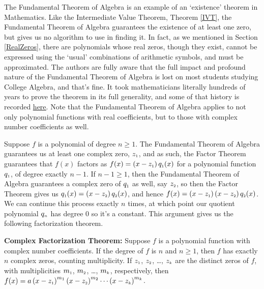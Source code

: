 \medskip

The Fundamental Theorem of Algebra is an example of an `existence' theorem in Mathematics.  Like the Intermediate Value Theorem, Theorem \ref{IVT}, the Fundamental Theorem of Algebra  guarantees the existence of at least one zero, but gives us no algorithm to use in finding it.  In fact, as we mentioned in Section \ref{RealZeros}, there are polynomials whose real zeros, though they exist, cannot be expressed using the `usual' combinations of arithmetic symbols, and must be approximated.  The authors are fully aware that the full impact and profound nature of the Fundamental Theorem of Algebra  is lost on most students studying College Algebra, and that's fine.  It took mathematicians literally hundreds of years to prove the theorem in its full generality, and some of that history is recorded \href{http://en.wikipedia.org/wiki/Fundamental_theorem_of_algebra}{\underline{here}}.  Note that the Fundamental Theorem of Algebra  applies to not only polynomial functions with real coefficients, but to those with complex number coefficients as well.  

\smallskip

Suppose  $f$ is a polynomial of degree $n \geq 1$.  The Fundamental Theorem of Algebra guarantees us at least one complex zero, $z_{\mbox{\tiny $1$}}$, and as such, the Factor Theorem guarantees that $f(x)$ factors as $f(x) = \left(x - z_{\mbox{\tiny $1$}}\right) q_{\mbox{\tiny $1$}}(x)$ for a polynomial function $q_{\mbox{\tiny $1$}}$,  of degree exactly $n-1$.  If $n-1 \geq 1$, then the Fundamental Theorem of Algebra guarantees a complex zero of $q_{\mbox{\tiny $1$}}$ as well, say $z_{\mbox{\tiny $2$}}$, so then the Factor Theorem gives us $q_{\mbox{\tiny $1$}}(x) = \left(x - z_{\mbox{\tiny $2$}}\right) q_{\mbox{\tiny $2$}}(x)$, and hence $f(x) = \left(x - z_{\mbox{\tiny $1$}}\right) \left(x - z_{\mbox{\tiny $2$}}\right) q_{\mbox{\tiny $2$}}(x)$.  We can continue this process exactly $n$ times, at which point our quotient polynomial $q_{\mbox{\tiny $n$}}$ has degree $0$ so it's a constant.  This argument gives us the following factorization theorem.

\smallskip

\colorbox{ResultColor}{\bbm
\begin{thm} \label{complexfactorization} \textbf{Complex Factorization Theorem:} Suppose $f$ is a polynomial function with complex number coefficients.  If the degree of $f$ is $n$ and $n \geq 1$, then  $f$ has exactly $n$ complex zeros, counting multiplicity.  If $z_{\mbox{\tiny $1$}}$, $z_{\mbox{\tiny $2$}}$, \ldots, $z_{\mbox{\tiny $k$}}$ are the distinct zeros of $f$, with multiplicities $m_{\mbox{\tiny $1$}}$, $m_{\mbox{\tiny $2$}}$, \ldots, $m_{\mbox{\tiny $k$}}$, respectively, then $f(x) = a\left(x - z_{\mbox{\tiny $1$}}  \right)^{m_{\mbox{\tiny $1$}}}\left(x - z_{\mbox{\tiny $2$}}  \right)^{m_{\mbox{\tiny $2$}}} \cdots \left(x - z_{\mbox{\tiny $k$}}  \right)^{m_{\mbox{\tiny $k$}}}$. 

\end{thm}
\ebm}

